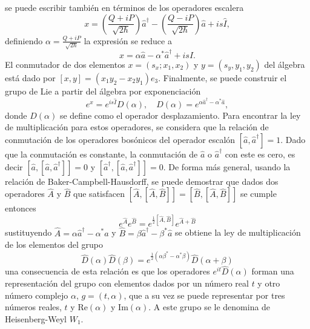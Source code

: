 se puede escribir también en términos de los operadores escalera
\begin{equation*}
  x = \left( \frac{Q+iP}{\sqrt{2\hbar}} \right)\hat{a}^{\dagger} - \left( \frac{Q-iP}{\sqrt{2\hbar}} \right)\hat{a} + is\hat{I},
\end{equation*}
definiendo $\alpha =  \frac{Q+iP}{\sqrt{2\hbar}}$ la expresión se reduce a
\begin{equation*}
  x = \alpha\hat{a} - \alpha^* \hat{a}^{\dagger} + is\hat{I}.
\end{equation*}
El conmutador de dos elementos $x = (s_x; x_1, x_2)$ y $y = (s_y, y_1, y_2)$ del álgebra está dado por $[x,y] = (x_1 y_2 - x_2 y_1)e_3$. Finalmente, se puede construir el grupo de Lie a partir del álgebra por exponenciación
\begin{equation*}
  e^{x} = e^{is\hat{I}}D(\alpha), \quad D(\alpha) = e^{\alpha\hat{a}^{\dagger} - \alpha^* \hat{a}},
\end{equation*}
donde $D(\alpha)$ se define como el operador desplazamiento. Para encontrar la ley de multiplicación para estos operadores, se considera que la relación de conmutación de los operadores bosónicos del operador escalón $[\hat{a}, \hat{a}^{\dagger}]=1$. Dado que la conmutación es constante, la conmutación de $\hat{a}$ o $\hat{a}^{\dagger}$ con este es cero, es decir $[\hat{a}, [\hat{a}, \hat{a}^{\dagger}]] = 0$ y $[\hat{a}^{\dagger}, [\hat{a}, \hat{a}^{\dagger}]] = 0$. De forma más general, usando la relación de Baker-Campbell-Hausdorff, se puede demostrar que dados dos operadores $\hat{A}$ y $\hat{B}$ que satisfacen $[\hat{A}, [\hat{A}, \hat{B}]] = [\hat{B}, [\hat{A}, \hat{B}]]$ se cumple entonces
\begin{equation*}
  e^{\hat{A}} e^{\hat{B}} = e^{\frac{1}{2}[\hat{A}, \hat{B}]}e^{\hat{A}+\hat{B}}
\end{equation*}
sustituyendo $\hat{A} = \alpha \hat{a}^{\dagger} - \alpha^* \hat{a}$ y $\hat{B} = \beta\hat{a}^{\dagger} - \beta^*\hat{a}$ se obtiene la ley de multiplicación de los elementos del grupo
\begin{equation*}
  \hat{D}(\alpha)\hat{D}(\beta) = e^{\frac{1}{2}(\alpha\beta^* - \alpha^*\beta)}\hat{D}(\alpha+\beta)
\end{equation*}
una consecuencia de esta relación es que los operadores $e^{it}\hat{D}(\alpha)$ forman una representación del grupo con elementos dados por un número real $t$ y otro número complejo $\alpha$, $g = (t, \alpha)$, que a su vez se puede representar por tres números reales, $t$ y $\mathrm{Re}(\alpha)$ y $\mathrm{Im}(\alpha)$. A este grupo se le denomina de Heisenberg-Weyl $W_1$.

